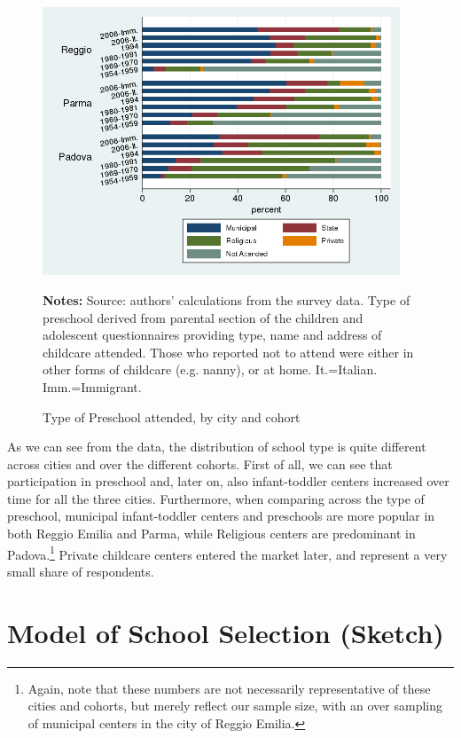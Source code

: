 \documentclass[12pt]{article}
\begin{document}
\begin{figure}[!htb]
\caption{Type of Preschool attended, by city and cohort}
\label{fig:preschoolAttend}
\begin{center}
\includegraphics[height=8cm]{maternaType-Attend.png}\\[0pt]
\end{center}
\par
{\footnotesize {{\bfseries Notes:} Source: authors' calculations from  the survey data. Type of preschool derived from parental section of the children and adolescent questionnaires providing type, name and address of childcare attended. Those who reported not to attend were either in other forms of childcare (e.g. nanny), or at home. It.=Italian. Imm.=Immigrant.} }
\end{figure}

As we can see from the data, the distribution of school type is quite different across cities and over the different cohorts. First of all, we can see that participation in preschool and, later on, also infant-toddler centers increased over time for all the three cities. Furthermore, when comparing across the type of preschool, municipal infant-toddler centers and preschools are more popular in both Reggio Emilia and Parma, while Religious centers are predominant in Padova.\footnote{Again, note that these numbers are not necessarily representative of these cities and cohorts, but merely reflect our sample size, with an over sampling of municipal centers in the city of Reggio Emilia.} Private childcare centers entered the market later, and represent a very small share of respondents.

\section{Model of School Selection (Sketch)}
\label{sec:model}
\end{document}
